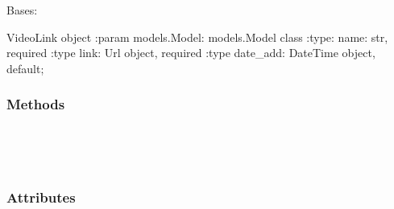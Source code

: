 \documentclass[letterpaper,10pt,english]{sphinxmanual}
\begin{document}
\begin{fulllineitems}
\label{\detokenize{vtcvlp:vtcuser.models.VideoLink}}
Bases: 

VideoLink object
:param models.Model: models.Model class
:type: name: str, required
:type link: Url object, required
:type date\_add: DateTime object, default;
\subsubsection*{Methods}


\begin{savenotes}\sphinxatlongtablestart\begin{longtable}[c]{}
\hline

\endfirsthead

%
{}\\
\hline

\endhead

\hline
{}\\
\endfoot

\endlastfoot

\end{longtable}\sphinxatlongtableend\end{savenotes}
\subsubsection*{Attributes}


\begin{savenotes}\sphinxatlongtablestart\begin{longtable}[c]{}
\hline

\endfirsthead

%
{}\\
\hline

\endhead

\hline
{}\\
\endfoot


\end{longtable}
\end{savenotes}
\end{fulllineitems}
\end{document}
